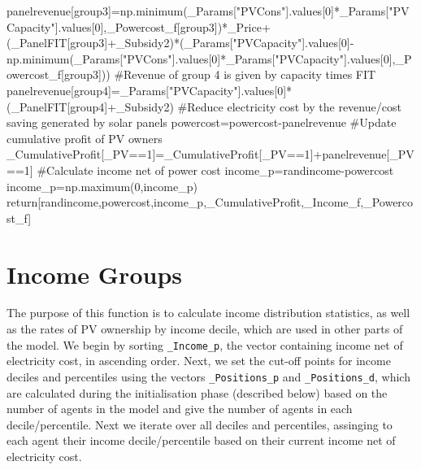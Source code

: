 \documentclass[
  letterpaper,
  DIV=11,
  numbers=noendperiod]{scrartcl}
\newenvironment{Shaded}{\begin{snugshade}}{\end{snugshade}}
\newcommand{\CommentTok}[1]{\textcolor[rgb]{0.37,0.37,0.37}{#1}}
\newcommand{\ControlFlowTok}[1]{\textcolor[rgb]{0.00,0.23,0.31}{#1}}
\newcommand{\DecValTok}[1]{\textcolor[rgb]{0.68,0.00,0.00}{#1}}
\newcommand{\NormalTok}[1]{\textcolor[rgb]{0.00,0.23,0.31}{#1}}
\newcommand{\OperatorTok}[1]{\textcolor[rgb]{0.37,0.37,0.37}{#1}}
\newcommand{\StringTok}[1]{\textcolor[rgb]{0.13,0.47,0.30}{#1}}
\begin{document}
\begin{Shaded}
\begin{Highlighting}[]
\NormalTok{    panelrevenue[group3]}\OperatorTok{=}\NormalTok{np.minimum(\_Params[}\StringTok{"PVCons"}\NormalTok{].values[}\DecValTok{0}\NormalTok{]}\OperatorTok{*}\NormalTok{\_Params[}\StringTok{"PVCapacity"}\NormalTok{].values[}\DecValTok{0}\NormalTok{],\_Powercost\_f[group3])}\OperatorTok{*}\NormalTok{\_Price}\OperatorTok{+}\NormalTok{(\_PanelFIT[group3]}\OperatorTok{+}\NormalTok{\_Subsidy2)}\OperatorTok{*}\NormalTok{(\_Params[}\StringTok{"PVCapacity"}\NormalTok{].values[}\DecValTok{0}\NormalTok{]}\OperatorTok{{-}}\NormalTok{np.minimum(\_Params[}\StringTok{"PVCons"}\NormalTok{].values[}\DecValTok{0}\NormalTok{]}\OperatorTok{*}\NormalTok{\_Params[}\StringTok{"PVCapacity"}\NormalTok{].values[}\DecValTok{0}\NormalTok{],\_Powercost\_f[group3]))}
    \CommentTok{\#Revenue of group 4 is given by capacity times FIT}
\NormalTok{    panelrevenue[group4]}\OperatorTok{=}\NormalTok{\_Params[}\StringTok{"PVCapacity"}\NormalTok{].values[}\DecValTok{0}\NormalTok{]}\OperatorTok{*}\NormalTok{(\_PanelFIT[group4]}\OperatorTok{+}\NormalTok{\_Subsidy2)}
    \CommentTok{\#Reduce electricity cost by the revenue/cost saving generated by solar panels}
\NormalTok{    powercost}\OperatorTok{=}\NormalTok{powercost}\OperatorTok{{-}}\NormalTok{panelrevenue}
    \CommentTok{\#Update cumulative profit of PV owners}
\NormalTok{    \_CumulativeProfit[\_PV}\OperatorTok{==}\DecValTok{1}\NormalTok{]}\OperatorTok{=}\NormalTok{\_CumulativeProfit[\_PV}\OperatorTok{==}\DecValTok{1}\NormalTok{]}\OperatorTok{+}\NormalTok{panelrevenue[\_PV}\OperatorTok{==}\DecValTok{1}\NormalTok{]}
    \CommentTok{\#Calculate income net of power cost}
\NormalTok{    income\_p}\OperatorTok{=}\NormalTok{randincome}\OperatorTok{{-}}\NormalTok{powercost}
\NormalTok{    income\_p}\OperatorTok{=}\NormalTok{np.maximum(}\DecValTok{0}\NormalTok{,income\_p)}
    \ControlFlowTok{return}\NormalTok{[randincome,powercost,income\_p,\_CumulativeProfit,\_Income\_f,\_Powercost\_f]}
\end{Highlighting}
\end{Shaded}

\hypertarget{income-groups}{%
\section{Income Groups}\label{income-groups}}

The purpose of this function is to calculate income distribution
statistics, as well as the rates of PV ownership by income decile, which
are used in other parts of the model. We begin by sorting
\texttt{\_Income\_p}, the vector containing income net of electricity
cost, in ascending order. Next, we set the cut-off points for income
deciles and percentiles using the vectors \texttt{\_Positions\_p} and
\texttt{\_Positions\_d}, which are calculated during the initialisation
phase (described below) based on the number of agents in the model and
give the number of agents in each decile/percentile. Next we iterate
over all deciles and percentiles, assinging to each agent their income
decile/percentile based on their current income net of electricity cost.
\end{document}
